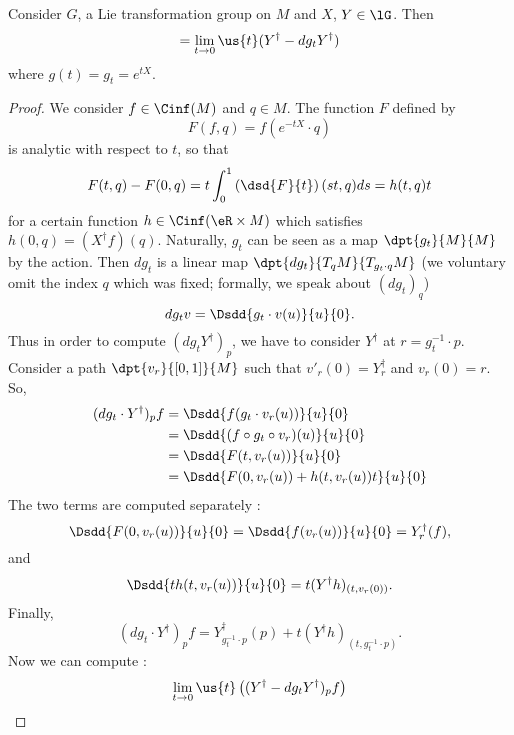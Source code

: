 \begin{theorem}
Consider $G$, a Lie transformation group on $M$ and $X$, $Y\in\lG$. Then
\begin{equation}
  [X^{\dag},Y^{\dag}]=\lim_{t\to 0}\us{t}(Y^{\dag}-dg_t Y^{\dag})
\end{equation}
where $g(t)=g_t=e^{tX}$.
\end{theorem}

\begin{proof}
We consider $f\in\Cinf(M)$ and $q\in M$. The function $F$ defined by
\begin{equation}
  F(f,q)=f(e^{-tX}\cdot q)
\end{equation}
is analytic with respect to $t$, so that
\begin{equation}\label{eq:def_F_h}
  F(t,q)-F(0,q)=t\int^1_0\left(\dsd{F}{t}\right)(st,q)ds=h(t,q)t
\end{equation}
for a certain function $h\in\Cinf(\eR\times M)$ which satisfies $h(0,q)=(X^{\dag} f)(q)$.
Naturally, $g_t$ can be seen as a map $\dpt{g_t}{M}{M}$ by the action. Then $dg_t$ is a linear map $\dpt{dg_t}{T_qM}{T_{g_t\cdot q}M}$  (we voluntary omit the index $q$ which was fixed; formally, we speak about $(dg_t)_q$)
\[
   dg_tv=\Dsdd{g_t\cdot v(u)}{u}{0}.
\]
Thus in order to compute $(dg_t Y^{\dag})_p$, we have to consider $Y^{\dag}$ at $r=g_t^{-1}\cdot p$. Consider a path $\dpt{v_r}{[0,1]}{M}$ such that $v'_r(0)=Y^{\dag}_r$ and $v_r(0)=r$. So,
\begin{equation}
\begin{split}
(dg_t\cdot Y^{\dag})_pf&=\Dsdd{ f(g_t\cdot v_r(u)) }{u}{0}\\
                     &=\Dsdd{ (f\circ g_t\circ v_r)(u) }{u}{0}\\
		     &=\Dsdd{ F(t,v_r(u)) }{u}{0}\\
		     &=\Dsdd{ F(0,v_r(u))+h(t,v_r(u))t }{u}{0}
\end{split}
\end{equation}
The two terms are computed separately :
\[
   \Dsdd{ F(0,v_r(u)) }{u}{0}=\Dsdd{ f(v_r(u)) }{u}{0}=Y^{\dag}_r(f),
\]
and
\[
    \Dsdd{ th(t,v_r(u)) }{u}{0}=t(Y^{\dag} h)_{(t,v_r(0))}.
\]
Finally,
\begin{equation}\label{eq:Y_h}
  (dg_t\cdot Y^{\dag})_pf=Y^{\dag}_{g_t^{-1}\cdot p}(p)+t(Y^{\dag} h)_{(t,g_t^{-1}\cdot p)}.
\end{equation}
Now we can compute :
\begin{equation}
\begin{aligned}
  \lim_{t\to 0}\us{t}\left( (Y^{\dag}-dg_tY^{\dag})_pf \right)

\end{aligned}
\end{equation}
\end{proof}
